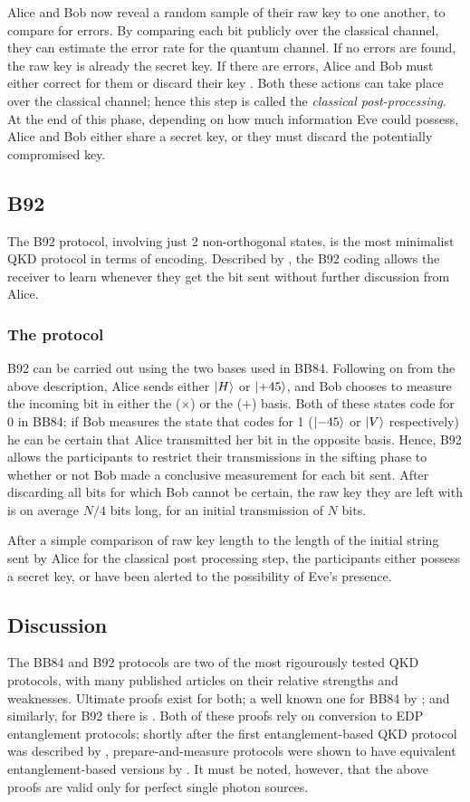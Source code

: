 \documentclass[paper=a4, fontsize=11pt]{scrartcl} %
\numberwithin{equation}{section} %
\numberwithin{figure}{section} %
\numberwithin{table}{section} %
\begin{document}
Alice and Bob now reveal a random sample of their raw key to one another, to compare for errors. By
comparing each bit publicly over the classical channel, they can estimate the error rate for
the quantum channel. If no errors are found, the raw key is already the secret key. If there are
errors, Alice and Bob must either correct for them or discard their key \citep{reviewScariani}. Both these actions can
take place over the classical channel; hence this step is called the \textit{classical post-processing}.
At the end of this phase, depending on how much information Eve could possess, Alice and Bob either share
a secret key, or they must discard the potentially compromised key.

\subsection{B92}
The B92 protocol, involving just 2 non-orthogonal states, is the
most minimalist QKD protocol in terms of encoding. Described by \citet{B92},
the B92 coding allows the receiver to learn whenever they get
the bit sent without further discussion from Alice.

\subsubsection{The protocol}
B92 can be carried out using the two bases used in BB84. Following on from the above description, Alice sends either
$\ket{H}$ or $\ket{+45}$, and Bob chooses to measure the incoming bit in either the ($\times$) or the ($+$)
basis. Both of these states code for 0 in BB84; if Bob measures the state that codes for 1 ($\ket{-45}$ or
$\ket{V}$ respectively) he can be certain that Alice transmitted her bit in the opposite basis. Hence, B92
allows the participants to restrict their transmissions in the sifting phase to whether or not Bob made
a conclusive measurement for each bit sent. After discarding all bits for which Bob cannot be certain, the raw
key they are left with is on average $N/4$ bits long, for an initial transmission of $N$ bits.

After a simple comparison of raw key length to the length of the initial string sent by Alice for the classical
post processing step, the participants either possess a secret key, or have been alerted to the possibility
of Eve's presence.

\subsection{Discussion}
The BB84 and B92 protocols are two of the most rigourously tested QKD protocols, with many published articles
on their relative strengths and weaknesses. Ultimate proofs exist for both; a well known one for BB84
by \citet{proofBB84}; and similarly, for B92 there is \citet{tamakiProofB92}. Both of these proofs rely on
conversion to EDP entanglement protocols; shortly after the first entanglement-based QKD protocol was
described by \citet{E91}, prepare-and-measure protocols were shown to have equivalent entanglement-based
versions by \citet{edpEquivProof}. It must be noted, however, that the above proofs are valid only
for perfect single photon sources.
\end{document}
